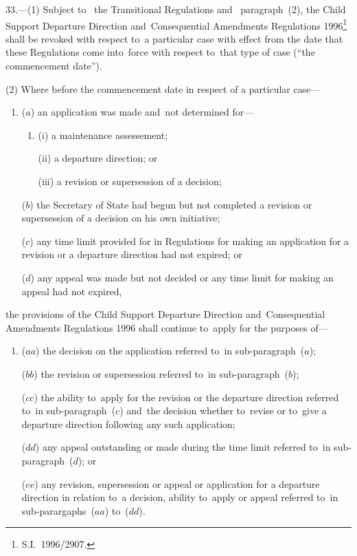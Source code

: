 \documentclass[12pt,a4paper]{article}
\begin{document}
33.---(1)  Subject to~
the Transitional Regulations and~ %
paragraph~(2), the Child Support Departure Direction and~Consequential Amendments Regulations 1996\footnote{S.I.\ 1996/2907.} shall be revoked with respect to~a particular case with effect from the date that these Regulations come into~force with respect to~that type of case (“the commencement date”).

(2) Where before the commencement date in respect of a particular case—
\begin{enumerate}\item[]
($a$) an application was made and~not determined for—
\begin{enumerate}\item[]
(i) a maintenance assessement;

(ii) a departure direction; or

(iii) a revision or supersession of a decision;
\end{enumerate}

($b$) the Secretary of State had begun but not completed a revision or supersession of a decision on his own initiative;

($c$) any time limit provided for in Regulations for making an application for a revision or a departure direction had not expired; or

($d$) any appeal was made but not decided or any time limit for making an appeal had not expired,
\end{enumerate}
the provisions of the Child Support Departure Direction and~Consequential Amendments Regulations 1996 shall continue to~apply for the purposes of—
\begin{enumerate}\item[]
($aa$) the decision on the application referred to~in sub-paragraph~($a$);

($bb$) the revision or supersession referred to~in sub-paragraph~($b$);

($cc$) the ability to~apply for the revision or the departure direction referred to~in sub-paragraph~($c$)  and~the decision whether to~revise or to~give a departure direction following any such application;

($dd$) any appeal outstanding or made during the time limit referred to~in sub-paragraph~($d$); or

\pagebreak[3]

($ee$) any revision, supersession or appeal or application for a departure direction in relation to~a decision, ability to~apply or appeal referred to~in sub-parargaphs~($aa$)  to~($dd$).
\end{enumerate}
\end{document}
